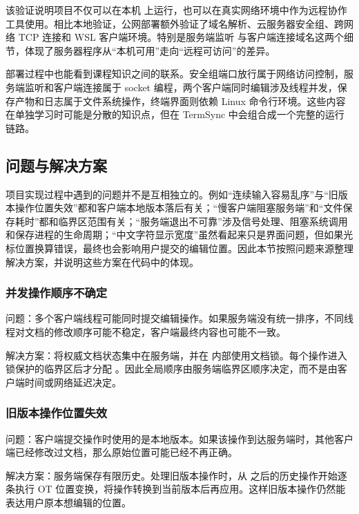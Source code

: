 该验证说明项目不仅可以在本机  上运行，也可以在真实网络环境中作为远程协作工具使用。相比本地验证，公网部署额外验证了域名解析、云服务器安全组、跨网络 TCP 连接和 WSL 客户端环境。特别是服务端监听  与客户端连接域名这两个细节，体现了服务器程序从“本机可用”走向“远程可访问”的差异。


部署过程中也能看到课程知识之间的联系。安全组端口放行属于网络访问控制，服务端监听和客户端连接属于 socket 编程，两个客户端同时编辑涉及线程并发，保存产物和日志属于文件系统操作，终端界面则依赖 Linux 命令行环境。这些内容在单独学习时可能是分散的知识点，但在 TermSync 中会组合成一个完整的运行链路。



\newpage
\subsection{问题与解决方案}

项目实现过程中遇到的问题并不是互相独立的。例如“连续输入容易乱序”与“旧版本操作位置失效”都和客户端本地版本落后有关；“慢客户端阻塞服务端”和“文件保存耗时”都和临界区范围有关；“服务端退出不可靠”涉及信号处理、阻塞系统调用和保存进程的生命周期；“中文字符显示宽度”虽然看起来只是界面问题，但如果光标位置换算错误，最终也会影响用户提交的编辑位置。因此本节按照问题来源整理解决方案，并说明这些方案在代码中的体现。


\subsubsection{并发操作顺序不确定}

问题：多个客户端线程可能同时提交编辑操作。如果服务端没有统一排序，不同线程对文档的修改顺序可能不稳定，客户端最终内容也可能不一致。

解决方案：将权威文档状态集中在服务端，并在  内部使用文档锁。每个操作进入锁保护的临界区后才分配 。因此全局顺序由服务端临界区顺序决定，而不是由客户端时间或网络延迟决定。

\subsubsection{旧版本操作位置失效}

问题：客户端提交操作时使用的是本地版本。如果该操作到达服务端时，其他客户端已经修改过文档，那么原始位置可能已经不再正确。

解决方案：服务端保存有限历史。处理旧版本操作时，从  之后的历史操作开始逐条执行 OT 位置变换，将操作转换到当前版本后再应用。这样旧版本操作仍然能表达用户原本想编辑的位置。

